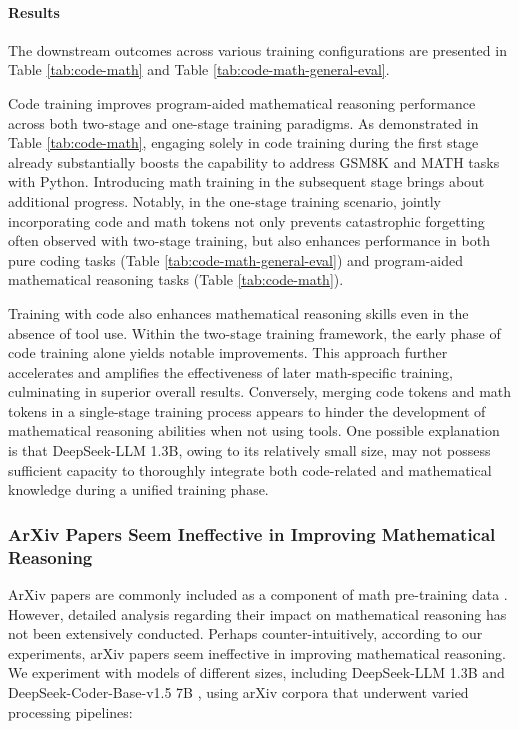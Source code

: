 \begin{itemize}[topsep=0pt]
\begin{itemize}[topsep=0pt]
\paragraph{Results}
The downstream outcomes across various training configurations are presented in Table \ref{tab:code-math} and Table \ref{tab:code-math-general-eval}.

Code training improves program-aided mathematical reasoning performance across both two-stage and one-stage training paradigms. As demonstrated in Table \ref{tab:code-math}, engaging solely in code training during the first stage already substantially boosts the capability to address GSM8K and MATH tasks with Python. Introducing math training in the subsequent stage brings about additional progress. Notably, in the one-stage training scenario, jointly incorporating code and math tokens not only prevents catastrophic forgetting often observed with two-stage training, but also enhances performance in both pure coding tasks (Table \ref{tab:code-math-general-eval}) and program-aided mathematical reasoning tasks (Table \ref{tab:code-math}).

Training with code also enhances mathematical reasoning skills even in the absence of tool use. Within the two-stage training framework, the early phase of code training alone yields notable improvements. This approach further accelerates and amplifies the effectiveness of later math-specific training, culminating in superior overall results. Conversely, merging code tokens and math tokens in a single-stage training process appears to hinder the development of mathematical reasoning abilities when not using tools. One possible explanation is that DeepSeek-LLM 1.3B, owing to its relatively small size, may not possess sufficient capacity to thoroughly integrate both code-related and mathematical knowledge during a unified training phase.

\subsubsection{ArXiv Papers Seem Ineffective in Improving Mathematical Reasoning}

ArXiv papers are commonly included as a component of math pre-training data \citep{minerva,gpt-f,llemma,mathpile}. However, detailed analysis regarding their impact on mathematical reasoning has not been extensively conducted. Perhaps counter-intuitively, according to our experiments, arXiv papers seem ineffective in improving mathematical reasoning. We experiment with models of different sizes, including DeepSeek-LLM 1.3B and DeepSeek-Coder-Base-v1.5 7B \citep{deepseek-coder}, using arXiv corpora that underwent varied processing pipelines:


\end{itemize}
\end{itemize}
